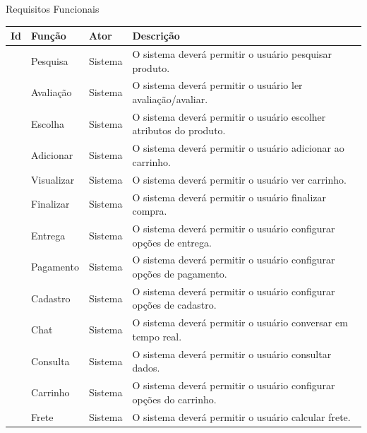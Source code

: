 \documentclass[
	12pt,				%
	openright,			%
	twoside,			%
	a4paper,			%
	english,			%
	brazil				%
	]{abntex2}
\begin{document}
\begin{quadro}[htb]
    \caption{\label{quadro_rf}Requisitos Funcionais}
    \small %
    \begin{adjustbox}{center}
        \begin{tabular}{|p{1.5cm}|p{3.5cm}|p{3.5cm}|p{4.5cm}|}
            \hline
            \textbf{Id} & \textbf{Função} & \textbf{Ator} & \textbf{Descrição} \\ \hline
            [RF001] & Pesquisa & Sistema & O sistema deverá permitir o usuário pesquisar produto. \\ \hline
            [RF002] & Avaliação & Sistema & O sistema deverá permitir o usuário ler avaliação/avaliar. \\ \hline
            [RF003] & Escolha & Sistema & O sistema deverá permitir o usuário escolher atributos do produto. \\ \hline
            [RF004] & Adicionar & Sistema & O sistema deverá permitir o usuário adicionar ao carrinho. \\ \hline
            [RF005] & Visualizar & Sistema & O sistema deverá permitir o usuário ver carrinho. \\ \hline
            [RF006] & Finalizar & Sistema & O sistema deverá permitir o usuário finalizar compra. \\ \hline
            [RF007] & Entrega & Sistema & O sistema deverá permitir o usuário configurar opções de entrega. \\ \hline
            [RF008] & Pagamento & Sistema & O sistema deverá permitir o usuário configurar opções de pagamento. \\ \hline
            [RF009] & Cadastro & Sistema & O sistema deverá permitir o usuário configurar opções de cadastro. \\ \hline
            [RF010] & Chat & Sistema & O sistema deverá permitir o usuário conversar em tempo real. \\ \hline
            [RF011] & Consulta & Sistema & O sistema deverá permitir o usuário consultar dados. \\ \hline
            [RF012] & Carrinho & Sistema & O sistema deverá permitir o usuário configurar opções do carrinho. \\ \hline
            [RF013] & Frete & Sistema & O sistema deverá permitir o usuário calcular frete. \\ \hline
        \end{tabular}
    \end{adjustbox}
\end{quadro}
\end{document}
